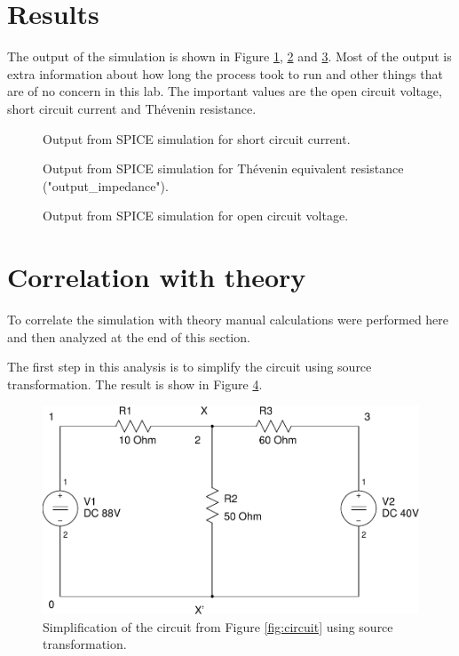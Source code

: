 \documentclass{article}
\begin{document}
\clearpage

\section{Results}

The output of the simulation is shown in Figure \ref{fig:out1}, \ref{fig:out2} and \ref{fig:out3}.
Most of the output is extra information about how long the process took
to run and other things that are of no concern in this lab.
The important values are the open circuit voltage,
short circuit current and Th\'{e}venin resistance.

\begin{figure}[!hbtp]

\caption{Output from SPICE simulation for short circuit current.}
\label{fig:out1}
\end{figure}

\begin{figure}[!hbtp]

\caption{Output from SPICE simulation for Th\'{e}venin equivalent
resistance ("output\_impedance").}
\label{fig:out2}
\end{figure}

\begin{figure}[!hbtp]

\caption{Output from SPICE simulation for open circuit voltage.}
\label{fig:out3}
\end{figure}

\clearpage


\section{Correlation with theory}

To correlate the simulation with theory manual calculations were
performed here and then analyzed at the end of this section.

The first step in this analysis is to simplify the circuit using
source transformation.  The result is show in Figure \ref{fig:circuit-02}.

\begin{figure}[!hbtp]
\center
\includegraphics[scale=0.5]{spice/circuit-02}
\caption{Simplification of the circuit from Figure \ref{fig:circuit}
using source transformation.}
\label{fig:circuit-02}
\end{figure}
\end{document}
